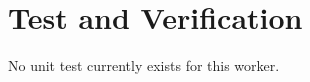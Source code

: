 \section*{Test and Verification}
\begin{flushleft}
	No unit test currently exists for this worker.
\end{flushleft}

